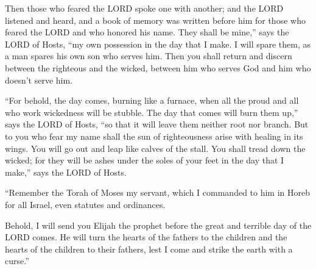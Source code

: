 \myverse{}Then those who feared the LORD spoke one with another; and the LORD listened and heard, and a book of memory was written before him for those who feared the LORD and who honored his name. \myverse{}They shall be mine,” says the LORD of Hosts, “my own possession in the day that I make. I will spare them, as a man spares his own son who serves him. \myverse{}Then you shall return and discern between the righteous and the wicked, between him who serves God and him who doesn’t serve him.


\mychapter{} \myverse*{}“For behold, the day comes, burning like a furnace, when all the proud and all who work wickedness will be stubble. The day that comes will burn them up,” says the LORD of Hosts, “so that it will leave them neither root nor branch. \myverse{}But to you who fear my name shall the sun of righteousness arise with healing in its wings. You will go out and leap like calves of the stall. \myverse{}You shall tread down the wicked; for they will be ashes under the soles of your feet in the day that I make,” says the LORD of Hosts.


\myverse{}“Remember the Torah of Moses my servant, which I commanded to him
in Horeb for all Israel, even statutes and ordinances.


\myverse{}Behold, I will send you Elijah the prophet before the great and
terrible day of the LORD comes. \myverse{}He will turn the hearts of the fathers to the children and the hearts of the children to their fathers, lest I come and strike the earth with a curse.”


